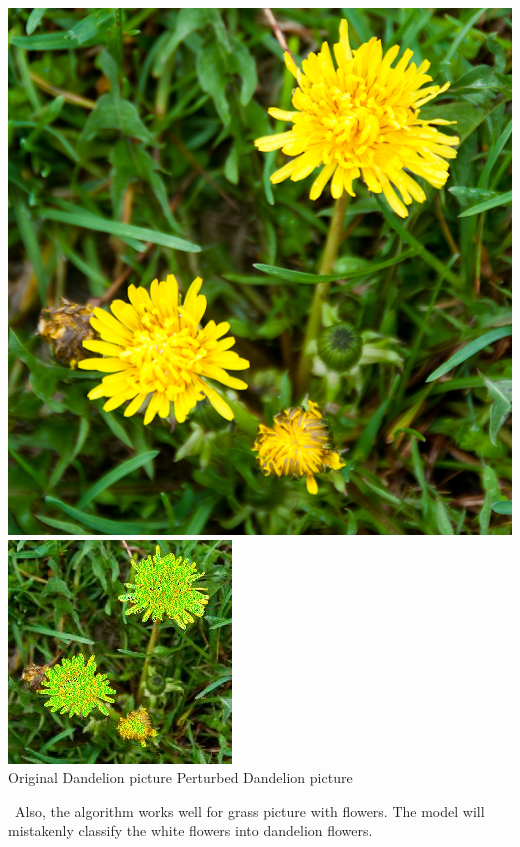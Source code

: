 \documentclass{article}
\begin{document}
\begin{center}
\includegraphics[scale=0.781]{dandelion-flowers-3932258560.jpg}\hspace{25pt}
\includegraphics[scale=0.6]{thumbnail_image_11.jpg}\\
\hspace{2pt}Original Dandelion picture 
\hspace{30pt} Perturbed Dandelion picture
\end{center}
\vspace{0.2in}
\
Also, the algorithm works well for grass picture with flowers. The model will mistakenly classify the white flowers into dandelion flowers.
\end{document}
